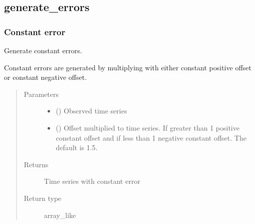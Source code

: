 \documentclass[letterpaper,10pt,english]{sphinxmanual}
\begin{document}
\subsection{generate\_errors}
\label{\detokenize{reference/generate_errors:generate-errors}}\label{\detokenize{reference/generate_errors::doc}}

\subsubsection{Constant error}
\label{\detokenize{reference/generate_errors:constant-error}}

\begin{fulllineitems}
\label{\detokenize{reference/generate_errors:de.generate_errors.constant}}
Generate constant errors.

Constant errors are generated by multiplying with either constant positive
offset or constant negative offset.
\begin{quote}\begin{description}
\item[{Parameters}] \leavevmode\begin{itemize}
\item {} 
 (\sphinxstyleliteralemphasis{\sphinxupquote{(}}\sphinxstyleliteralemphasis{\sphinxupquote{,}}\sphinxstyleliteralemphasis{\sphinxupquote{)}}) \textendash{} Observed time series

\item {} 
 (\sphinxstyleliteralemphasis{\sphinxupquote{, }}) \textendash{} Offset multiplied to time series. If greater than 1 positive constant
offset and if less than 1 negative constant offset. The default is 1.5.

\end{itemize}

\item[{Returns}] \leavevmode
{} \textendash{} Time series with constant error

\item[{Return type}] \leavevmode
array\_like

\end{description}\end{quote}

\end{fulllineitems}
\end{document}
